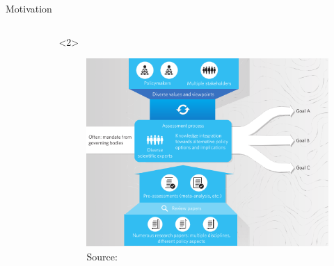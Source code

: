 \documentclass[9pt]{beamer}
\begin{document}
\begin{frame}{Motivation}
\begin{columns}
\begin{column}{0.5\linewidth}
\begin{center}
\begin{figure}
			\end{figure}
		\end{center}
	\end{column}
	\begin{column}{0.5\linewidth}<2>
		\begin{center}
			\begin{figure}
				\includegraphics[width=0.85\linewidth]{images/pyramid.png}
				\caption{Source: \citep{Kowarsch2015}}
			\end{figure}
		\end{center}
	\end{column}
\end{columns}

\end{frame}
\end{document}

